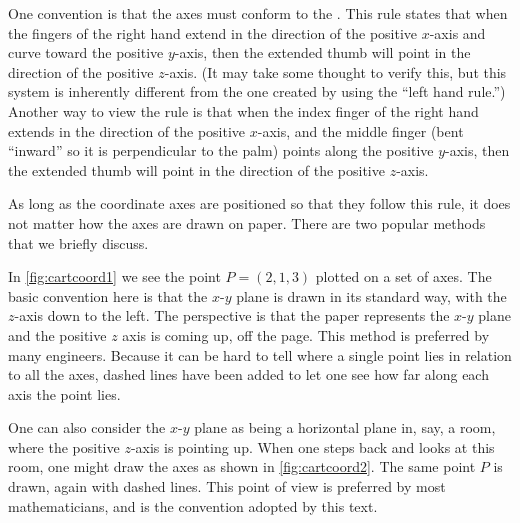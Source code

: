 One convention is that the axes must conform to the . This rule states that when the fingers of the right hand extend in the direction of the positive $x$-axis and curve toward the positive $y$-axis, then the extended thumb will point in the direction of the positive $z$-axis. (It may take some thought to verify this, but this system is inherently different from the one created by using the ``left hand rule.'')
Another way to view the rule is that when the index finger of the right hand extends in the direction of the positive $x$-axis, and the middle finger (bent ``inward'' so it is perpendicular to the palm) points along the positive $y$-axis, then the extended thumb will point in the direction of the positive $z$-axis.%

As long as the coordinate axes are positioned so that they follow this rule, it does not matter how the axes are drawn on paper. There are two popular methods that we briefly discuss.

In \autoref{fig:cartcoord1} we see the point $P=(2,1,3)$ plotted on a set of axes. The basic convention here is that the $x$-$y$ plane is drawn in its standard way, with the $z$-axis down to the left. The perspective  is that the paper represents the $x$-$y$ plane and the positive $z$ axis is coming up, off the page. This method is preferred by many engineers. Because it can be hard to tell where a single point lies in relation to all the axes, dashed lines have been added to let one see how far along each axis the point lies.

One can also consider the $x$-$y$ plane as being a horizontal plane in, say, a room, where the positive $z$-axis is pointing up. When one steps back and looks at this room, one might draw the axes as shown in \autoref{fig:cartcoord2}. The same point $P$ is drawn, again with dashed lines. This point of view is preferred by most mathematicians, and is the convention adopted by this text.

